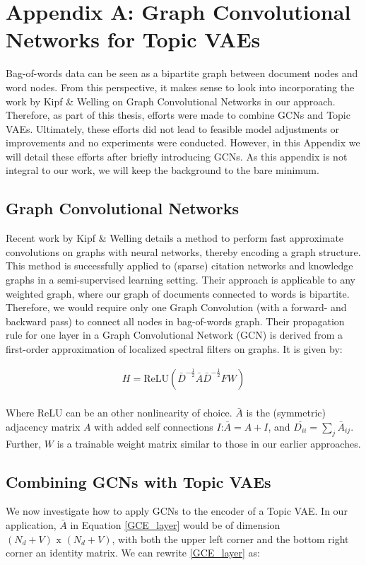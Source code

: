 \documentclass{report}
\begin{document}
	\chapter*{Appendix A: Graph Convolutional Networks for Topic VAEs}
	Bag-of-words data can be seen as a bipartite graph between document nodes and word nodes. From this perspective, it makes sense to look into incorporating the work by Kipf \& Welling \cite{kipf2016semi} on Graph Convolutional Networks in our approach. Therefore, as part of this thesis, efforts were made to combine GCNs and Topic VAEs. Ultimately, these efforts did not lead to feasible  model adjustments or improvements and no experiments were conducted. However, in this Appendix we will detail these efforts after briefly introducing GCNs. As this appendix is not integral to our work, we will keep the background to the bare minimum.

	\section{Graph Convolutional Networks}
	Recent work by Kipf \& Welling \cite{kipf2016semi} details a method to perform fast approximate convolutions on graphs with neural networks, thereby encoding a graph structure. This method is successfully applied to (sparse) citation networks and knowledge graphs in a semi-supervised learning setting. Their approach is applicable to any weighted graph, where our graph of documents connected to words is bipartite. Therefore, we would require only one Graph Convolution (with a forward- and backward pass) to connect all nodes in bag-of-words graph. Their propagation rule for one layer in a Graph Convolutional Network (GCN) is derived from a first-order approximation of localized spectral filters on graphs. It is given by:

	\begin{align}\label{GCE_layer}
	H = \text{ReLU}(\bar{D}^{-\frac{1}{2}}\bar{A}\bar{D}^{-\frac{1}{2}}FW)
	\end{align}
	\\
	Where ReLU can be an other nonlinearity of choice. $\bar{A}$ is the (symmetric) adjacency matrix $A$ with added self connections $I$:$\bar{A} = A+I$, and $\bar{D_{ii}}=\sum_j\bar{A}_{ij}$. Further, $W$ is a trainable weight matrix similar to those in our earlier approaches. 
	\section{Combining GCNs with Topic VAEs}	
	We now investigate how to apply GCNs to the encoder of a Topic VAE. In our application, $\bar{A}$ in Equation \ref{GCE_layer} would be of dimension $(N_d + V) \text{ x } (N_d + V)$, with both the upper left corner and the bottom right corner an identity matrix. We can rewrite \ref{GCE_layer} as:
	
\end{document}
